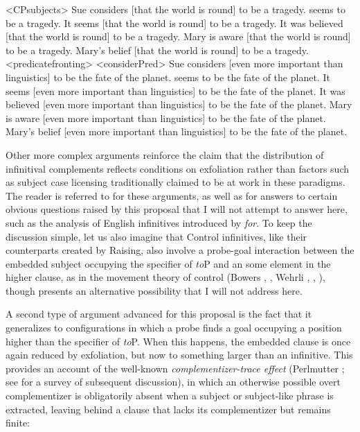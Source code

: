 \documentclass[output=paper]{langscibook}
\begin{document}
{\pex<CPsubjects>  
\a Sue considers [that the world is round] to be a tragedy.
 seems to be a tragedy. 
\a \ljudge*It seems [that the world is round] to be a tragedy.
\a \ljudge*It was believed [that the world is round] to be a tragedy.
\a \ljudge*Mary is aware [that the world is round] to be a tragedy.
\a  \ljudge*Mary's belief [that the world is round] to be a tragedy.
\xe
\pex[aboveexskip=0pt]<predicatefronting> 
\a<considerPred> Sue considers [even more important than linguistics] to be the fate of the planet.
 seems to be the fate of the planet. 
\a \ljudge*It seems [even more important than linguistics] to be the fate of the planet. 
\a \ljudge*It was believed [even more important than linguistics] to be the fate of the planet. 
\a \ljudge*Mary is aware [even more important than linguistics] to be the fate of the planet.
\a \ljudge*Mary's belief [even more important than linguistics] to be the fate of the planet. 
\xe

\noindent Other more complex arguments reinforce the claim that the distribution of infinitival complements reflects conditions on exfoliation rather than factors such as subject case licensing traditionally claimed to be at work in these paradigms. The reader is referred to \citet{Pesetsky:2019aa} for these arguments, as well as for answers to certain obvious questions raised by this proposal that I will not attempt to answer here, such as the analysis of English infinitives introduced by \textit{for}. To keep the discussion simple, let us also imagine that Control infinitives, like their counterparts created by Raising, also involve a probe-goal interaction between the embedded subject occupying the specifier of \textit{to}P and an some element in the higher clause, as in the movement theory of control (Bowers \citeyear[675 ff.]{Bowers1973}, \citeyear{bowers}, Wehrli \citeyear[115--131]{Wehrli1980}, \citeyear{Wehrli1981}, \citealt{Hornstein1999b}), though \citet{Pesetsky:2019aa} presents an alternative possibility that I will not address here.}

A second type of argument advanced for this proposal is the fact that it generalizes to configurations in which a probe finds a goal occupying a position higher than the specifier of \textit{to}P. When this happens, the embedded clause is once again reduced by exfoliation, but now to something larger than an infinitive. This provides an account of the well-known \textit{complementizer-trace effect} (Perlmutter \citeyear{Perlmutter1968,Perlmutter:1971}; see \citealt{pesetsky2015complementizer} for a survey of subsequent discussion), in which an otherwise possible overt complementizer is obligatorily absent when a subject or subject-like phrase is extracted, leaving behind a clause that lacks its complementizer but remains finite:\largerpage
\end{document}
